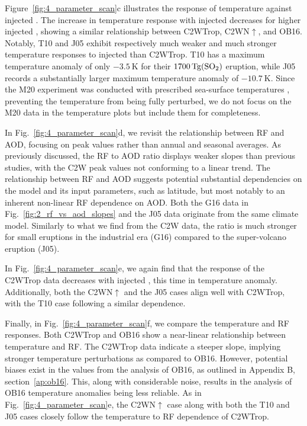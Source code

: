 \documentclass[draft]{agujournal2019}
\begin{document}
  Figure~\ref{fig:4_parameter_scan}c illustrates the response of temperature against
  injected . The increase in temperature response with injected 
  decreases for higher injected , showing a similar relationship between
  C2WTrop, C2WN\(\uparrow\), and OB16. Notably, T10 and J05 exhibit respectively much
  weaker and much stronger temperature responses to injected  than C2WTrop. T10
  has a maximum temperature anomaly of only \(\SI{-3.5}{\kelvin}\) for their
  \(\SI{1700}{\tera\gram(\ce{SO2})}\) eruption, while J05 records a substantially larger
  maximum temperature anomaly of \(\SI{-10.7}{\kelvin}\). Since the M20 experiment was
  conducted with prescribed sea-surface temperatures \cite{marshall2020}, preventing the
  temperature from being fully perturbed, we do not focus on the M20 data in the
  temperature plots but include them for completeness.

  In Fig.~\ref{fig:4_parameter_scan}d, we revisit the relationship between RF and AOD,
  focusing on peak values rather than annual and seasonal averages. As previously
  discussed, the RF to AOD ratio displays weaker slopes than previous studies, with the
  C2W peak values not conforming to a linear trend. The relationship between RF and AOD
  suggests potential substantial dependencies on the model and its input parameters,
  such as latitude, but most notably to an inherent non-linear RF dependence on AOD.
  Both the G16 data in Fig.~\ref{fig:2_rf_vs_aod_slopes} and the J05 data originate from
  the same climate model. Similarly to what we find from the C2W data, the ratio is much
  stronger for small eruptions in the industrial era (G16) compared to the super-volcano
  eruption (J05).

  In Fig.~\ref{fig:4_parameter_scan}e, we again find that the response of the C2WTrop
  data decreases with injected , this time in temperature anomaly. Additionally,
  both the C2WN\(\uparrow\) and the J05 cases align well with C2WTrop, with the T10 case
  following a similar dependence.

  Finally, in Fig.~\ref{fig:4_parameter_scan}f, we compare the temperature and RF
  responses. Both C2WTrop and OB16 show a near-linear relationship between temperature
  and RF. The C2WTrop data indicate a steeper slope, implying stronger temperature
  perturbations as compared to OB16. However, potential biases exist in the values from
  the analysis of OB16, as outlined in Appendix B, section~\ref{ap:ob16}. This, along
  with considerable noise, results in the analysis of OB16 temperature anomalies being
  less reliable. As in Fig.~\ref{fig:4_parameter_scan}e, the C2WN\(\uparrow\) case along
  with both the T10 and J05 cases closely follow the temperature to RF dependence of
  C2WTrop.
\end{document}
